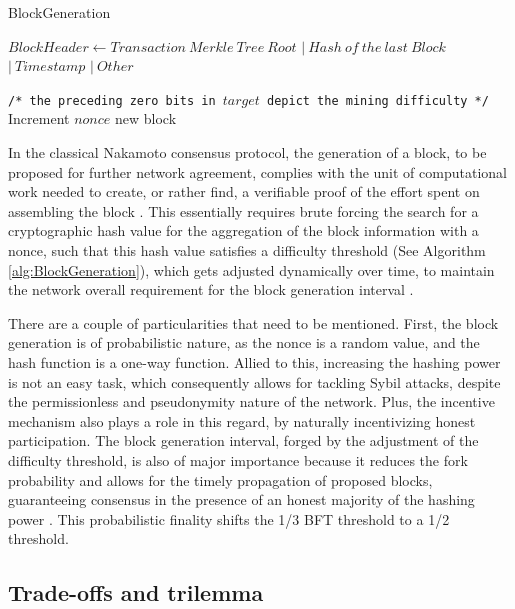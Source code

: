 \documentclass[journal]{IEEEtran}
\newcommand{\LineComment}[1]{\State \texttt{/* #1 */}}
\begin{document}
\begin{algorithm}
  \caption[short]{BlockGeneration}\label{alg:BlockGeneration}
  \begin{algorithmic}[1]
    \Function {}{}
      \State $Block Header \gets Transaction \ Merkle \ Tree \ Root$
      \Indent
        \State $| \ Hash \ of \ the \ last \ Block$
        \State $| \ Timestamp$
        \State $| \ Other$
      \EndIndent
      
      \LineComment{the preceding zero bits in $target$ depict the mining difficulty}
      \State Increment $nonce$
      \EndWhile
      \State \Return new block
    \EndFunction
  \end{algorithmic}
  \end{algorithm}
  
In the classical Nakamoto consensus protocol, the generation of a block, to be proposed
for further network agreement, complies with the unit of computational work needed to
create, or rather find, a verifiable proof of the effort spent on assembling the block \cite{nakamoto2008bitcoin}. 
This essentially requires brute forcing the search for a cryptographic hash value for the
aggregation of the block information with a nonce, such that this hash value satisfies
a difficulty threshold (See Algorithm \ref{alg:BlockGeneration}), which gets adjusted dynamically over time, to maintain the network overall 
requirement for the block generation interval \cite{survey-dist-consensus}.

There are a couple of particularities that need to be mentioned. First, the block generation
is of probabilistic nature, as the nonce is a random value, and the hash function is a one-way function.
Allied to this, increasing the hashing power is not an easy task, which consequently allows for tackling Sybil attacks,
despite the permissionless and pseudonymity nature of the network. Plus, the incentive mechanism
also plays a role in this regard, by naturally incentivizing honest participation.
The block generation interval, forged by the adjustment of the difficulty
threshold, is also of major importance because it reduces the fork probability and
allows for the timely propagation of proposed blocks, guaranteeing consensus
in the presence of an honest majority of the hashing power \cite{garay2015bitcoin}.
This probabilistic finality shifts the 1/3 BFT threshold to a 1/2 threshold.

\subsection{Trade-offs and trilemma}
\end{document}
